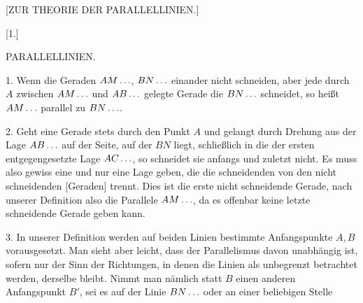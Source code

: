 \clearpage{}
\begin{center}
[ZUR THEORIE DER PARALLELLINIEN.]
\end{center}

\begin{center}
[1.]

PARALLELLINIEN.
\end{center}

1. Wenn die Geraden $AM\mathinner{.\,.\,.}$, $BN\mathinner{.\,.\,.}$ einander nicht schneiden, aber jede durch $A$ zwischen $AM\mathinner{.\,.\,.}$ und $AB\mathinner{.\,.\,.}$ gelegte Gerade die $BN\mathinner{.\,.\,.}$ schneidet, so heißt $AM\mathinner{.\,.\,.}$ parallel zu $BN\mathinner{.\,.\,.}$.

2. Geht eine Gerade stets durch den Punkt $A$ und gelangt durch Drehung aus der Lage $AB\mathinner{.\,.\,.}$ auf der Seite, auf der $BN$ liegt, schließlich in die der ersten entgegengesetzte Lage $AC\mathinner{.\,.\,.}$, so schneidet sie anfangs und zuletzt nicht. Es muss also gewiss eine und nur eine Lage geben, die die schneidenden von den nicht schneidenden [Geraden] trennt. Dies ist die erste nicht schneidende Gerade, nach unserer Definition also die Parallele $AM\mathinner{.\,.\,.}$, da es offenbar keine letzte schneidende Gerade geben kann.

\begin{center}

\end{center}

3. In unserer Definition werden auf beiden Linien bestimmte Anfangspunkte $A, B$ vorausgesetzt. Man sieht aber leicht, dass der Parallelismus davon unabhängig ist, sofern nur der Sinn der Richtungen, in denen die Linien als unbegrenzt betrachtet werden, derselbe bleibt. Nimmt man nämlich statt $B$ einen anderen Anfangspunkt $B'$, sei es auf der Linie $BN\mathinner{.\,.\,.}$ oder an einer beliebigen Stelle
